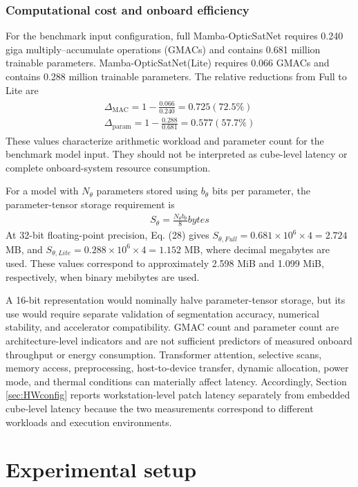 \documentclass[a4paper,fleqn]{cas-dc}
\begin{document}
\subsubsection{Computational cost and onboard efficiency}
For the benchmark input configuration, full Mamba-OpticSatNet requires 0.240 giga multiply–accumulate operations (GMACs) and contains 0.681 million trainable parameters. Mamba-OpticSatNet(Lite) requires 0.066 GMACs and contains 0.288 million trainable parameters. The relative reductions from Full to Lite are
\begin{eqnarray}
	\begin{aligned}
	\Delta_{\mathrm{MAC}} = 1 - \frac{0.066}{0.240} = 0.725 (72.5 \%)\\
	\Delta_{\mathrm{param}} = 1 - \frac{0.288}{0.681} = 0.577 (57.7 \%)
	\end{aligned}
\end{eqnarray}
These values characterize arithmetic workload and parameter count for the benchmark model input. They should not be interpreted as cube-level latency or complete onboard-system resource consumption.

For a model with \(N_{\theta}\) parameters stored using \(b_{\theta}\) bits per parameter, the parameter-tensor storage requirement is
\begin{eqnarray}
	S_{\theta} = \frac{N_{\theta} b_{\theta}}{8} bytes
\end{eqnarray}
At 32-bit floating-point precision, Eq. (28) gives \(S_{\theta,Full} = 0.681 \times 10^6  \times 4 = 2.724\) MB, and \(S_{\theta,Lite} = 0.288 \times 10^6  \times 4 = 1.152\) MB, where decimal megabytes are used. These values correspond to approximately 2.598 MiB and 1.099 MiB, respectively, when binary mebibytes are used.

A 16-bit representation would nominally halve parameter-tensor storage, but its use would require separate validation of segmentation accuracy, numerical stability, and accelerator compatibility.
GMAC count and parameter count are architecture-level indicators and are not sufficient predictors of measured onboard throughput or energy consumption. Transformer attention, selective scans, memory access, preprocessing, host-to-device transfer, dynamic allocation, power mode, and thermal conditions can materially affect latency. Accordingly, Section \ref{sec:HWconfig} reports workstation-level patch latency separately from embedded cube-level latency because the two measurements correspond to different workloads and execution environments.
\section{Experimental setup}
\end{document}
